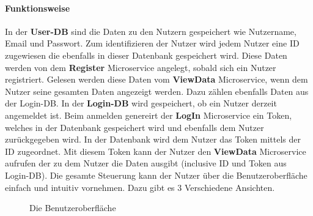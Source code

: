 \paragraph{Funktionsweise}
In der \textbf{User-DB} sind die Daten zu den Nutzern gespeichert wie Nutzername, Email und Passwort. Zum identifizieren der Nutzer wird jedem Nutzer eine ID zugewiesen die ebenfalls in dieser Datenbank gespeichert wird. Diese Daten werden von dem \textbf{Register} Microservice angelegt, sobald sich ein Nutzer registriert. \newline
Gelesen werden diese Daten vom \textbf{ViewData} Microservice, wenn dem Nutzer seine gesamten Daten angezeigt werden. Dazu zählen ebenfalls Daten aus der Login-DB. \newline
In der \textbf{Login-DB} wird gespeichert, ob ein Nutzer derzeit angemeldet ist. Beim anmelden genereirt der \textbf{LogIn} Microservice ein Token, welches in der Datenbank gespeichert wird und ebenfalls dem Nutzer zurückgegeben wird. In der Datenbank wird dem Nutzer das Token mittels der ID zugeordnet. \newline
Mit diesem Token kann der Nutzer den \textbf{ViewData} Microservice aufrufen der zu dem Nutzer die Daten ausgibt (inclusive ID und Token aus Login-DB). \newline
Die gesamte Steuerung kann der Nutzer über die Benutzeroberfläche einfach und intuitiv vornehmen. Dazu gibt es 3 Verschiedene Ansichten. 
\begin{figure}[bth]
	\hfill
	\caption{Die Benutzeroberfläche}
	\label{fig:UI}
\end{figure}

